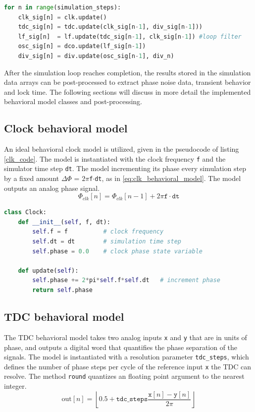 \begin{lstlisting}[language={Python}, caption={PLL simulation loop Python pseudocode}, label={sim_code}]
for n in range(simulation_steps):
    clk_sig[n] = clk.update()
    tdc_sig[n] = tdc.update(clk_sig[n-1], div_sig[n-1]))
    lf_sig[n]  = lf.update(tdc_sig[n-1], clk_sig[n-1]) #loop filter
    osc_sig[n] = dco.update(lf_sig[n-1])
    div_sig[n] = div.update(osc_sig[n-1], div_n)
    \end{lstlisting}
After the simulation loop reaches completion, the results stored in the simulation data arrays can be post-processed to extract phase noise data, transient behavior and lock time. The following sections will discuss in more detail the implemented behavioral model classes and post-processing.

\subsection{Clock behavioral model}
An ideal behavioral clock model is utilized, given in the pseudocode of listing \ref{clk_code}. The model is instantiated with the clock frequency \texttt{f} and the simulator time step \texttt{dt}. The model incrementing its phase every simulation step by a fixed amount $\Delta \Phi$ = $2\pi$\texttt{f}$\cdot$\texttt{dt}, as in \ref{eq:clk_behavioral_model}. The model outputs an analog phase signal.
\begin{equation}\label{eq:clk_behavioral_model}
	\Phi_{clk}[n] = \Phi_{clk}[n-1] + 2\pi\mathtt{f}\cdot\mathtt{dt}
\end{equation}

\begin{lstlisting}[language={Python}, caption={Ideal clock behavioral model Python pseudocode.}, label={clk_code}]
class Clock:
	def __init__(self, f, dt):
		self.f = f 			# clock frequency
		self.dt = dt 		# simulation time step
		self.phase = 0.0	# clock phase state variable

	def update(self):
		self.phase += 2*pi*self.f*self.dt 	# increment phase
		return self.phase
    \end{lstlisting}

\subsection{TDC behavioral model}
The TDC behavioral model takes two analog inputs \texttt{x} and \texttt{y} that are in units of phase, and outputs a digital word that quantifies the phase separation of the signals. The model is instantiated with a resolution parameter \texttt{tdc\_steps}, which defines the number of phase steps per cycle of the reference input \texttt{x} the TDC can resolve. The method \texttt{round} quantizes an floating point argument to the nearest integer.
\begin{equation}
	\text{out}[n] = \left\lfloor0.5 + \mathtt{tdc\_steps}\frac{\mathtt{x}[n]-\mathtt{y}[n]}{2\pi} \right\rfloor
\end{equation}

